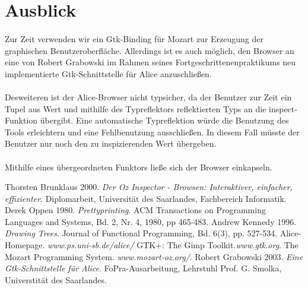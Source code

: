 \documentclass[12pt,a4paper]{article}
\begin{document}

\section{Ausblick}

\paragraph{}

Zur Zeit verwenden wir ein Gtk-Binding f\"ur Mozart \cite{mo:mo}
zur Erzeugung der graphischen Benutzeroberfl\"ache. Allerdings ist 
es auch m\"oglich, den Browser an eine von Robert Grabowski im Rahmen 
seines Fortgeschrittenenpraktikums neu implementierte Gtk-Schnittstelle
f\"ur Alice \cite{gr:gt} anzuschlie\ss en.

\paragraph{}

Desweiteren ist der Alice-Browser nicht typsicher, 
da der Benutzer zur Zeit ein Tupel aus 
Wert und mithilfe des Typreflektors reflektierten Typs 
an die inspect-Funktion \"ubergibt.  
Eine automatische Typreflektion w\"urde die Benutzung des Tools 
erleichtern und eine Fehlbenutzung ausschlie\ss en. 
In diesem Fall m\"usste der Benutzer nur noch den zu 
inspizierenden Wert \"ubergeben. 

\paragraph{}

Mithilfe eines \"ubergeordneten Funktors lie\ss e 
sich der Browser einkapseln.



\begin{thebibliography}{99}

 Thorsten Brunklaus 2000. {\em Der Oz Inspector - Browsen: 
    Interaktiver, einfacher, effizienter}. Diplomarbeit, Universit\"at 
    des Saarlandes, Fachbereich Informatik.
 Derek Oppen 1980. {\em Prettyprinting}. ACM Transactions 
  on Programming Languages and Systems, Bd. 2, Nr. 4, 1980, pp 465-483.
 Andrew Kennedy 1996. {\em Drawing Trees}. 
                Journal of Functional Programming, Bd. 6(3), pp. 527-534.
 Alice-Homepage. {\em www.ps.uni-sb.de/alice/}
 GTK+: The Gimp Toolkit.{\em www.gtk.org}. 
 The Mozart Programming System. {\em www.mozart-oz.org/}.
 Robert Grabowski 2003. {\em Eine Gtk-Schnittstelle f\"ur 
                Alice}. 
                FoPra-Ausarbeitung, Lehrstuhl Prof. G. Smolka, 
                Universtit\"at des Saarlandes.

\end{thebibliography}
\end{document}
